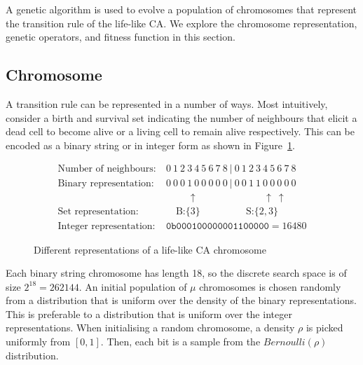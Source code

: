A genetic algorithm is used to evolve a population of chromosomes that represent the transition rule of the life-like CA. We explore the chromosome representation, genetic operators, and fitness function in this section.

\subsection{Chromosome}
A transition rule can be represented in a number of ways. Most intuitively, consider a birth and survival set indicating the number of neighbours that elicit a dead cell to become alive or a living cell to remain alive respectively. This can be encoded as a binary string or in integer form as shown in Figure~\ref{fig:bs-calc}.\\

\begin{figure}[H] 
\begin{equation*} 
\begin{split}
    \text{Number of neighbours:}&\ 0\ 1\ 2\ 3\ 4\ 5\ 6\ 7\ 8\ |\ 0\ 1\ 2\ 3\ 4\ 5\ 6\ 7\ 8\\
    \text{Binary representation:}&\ 0\ 0\ 0\ 1\ 0\ 0\ 0\ 0\ 0\ |\ 0\ 0\ 1\ 1\ 0\ 0\ 0\ 0\ 0\\
    &\qquad\ \: \uparrow \qquad \qquad \qquad \ \: \: \uparrow \ \uparrow\\
    \text{Set representation:}&\quad \ \text{B:} \{3\} \qquad \qquad \ \ \: \text{S:}\{2, 3\}\\
    \text{Integer representation:}&\ \texttt{0b000100000001100000} = 16480
\end{split}   
\end{equation*}
\caption{Different representations of a life-like CA chromosome}
\label{fig:bs-calc}
\end{figure}

Each binary string chromosome has length 18, so the discrete search space is of size $2^{18} = 262144$. An initial population of $\mu$ chromosomes is chosen randomly from a distribution that is uniform over the density of the binary representations. This is preferable to a distribution that is uniform over the integer representations\cite{mitchell1994evolving}. When initialising a random chromosome, a density $\rho$ is picked uniformly from $[0, 1]$. Then, each bit is a sample from the $\mathit{Bernoulli}(\rho)$ distribution.

